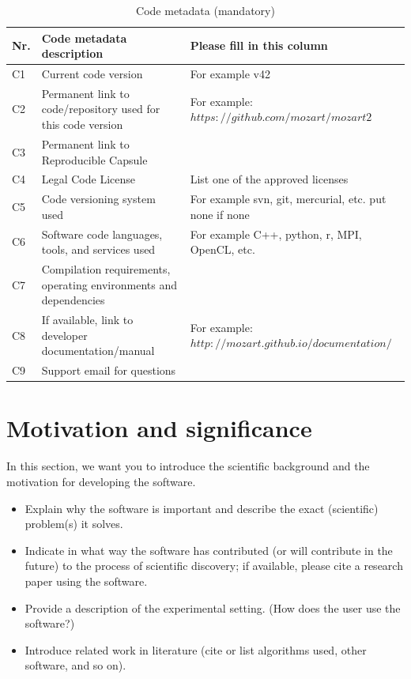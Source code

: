 \documentclass[preprint,12pt, a4paper]{elsarticle}
\begin{document}
\begin{table}[!h]
\begin{tabular}{|l|p{6.5cm}|p{6.5cm}|}
\hline
\textbf{Nr.} & \textbf{Code metadata description} & \textbf{Please fill in this column} \\
\hline
C1 & Current code version & For example v42 \\
\hline
C2 & Permanent link to code/repository used for this code version & For example: $https://github.com/mozart/mozart2$ \\
\hline
C3  & Permanent link to Reproducible Capsule & \\
\hline
C4 & Legal Code License   & List one of the approved licenses \\
\hline
C5 & Code versioning system used & For example svn, git, mercurial, etc. put none if none \\
\hline
C6 & Software code languages, tools, and services used & For example C++, python, r, MPI, OpenCL, etc. \\
\hline
C7 & Compilation requirements, operating environments and dependencies & \\
\hline
C8 & If available, link to developer documentation/manual & For example: $http://mozart.github.io/documentation/$ \\
\hline
C9 & Support email for questions & \\
\hline
\end{tabular}
\caption{Code metadata (mandatory)}
\label{}
\end{table}

\section{Motivation and significance}

In this section, we want you to introduce the scientific background and the
motivation for developing the software.

\begin{itemize}
  \item Explain why the software is important and describe the exact
      (scientific) problem(s) it solves.

  \item Indicate in what way the software has contributed (or will contribute
      in the future) to the process of scientific discovery; if available,
      please cite a research paper using the software.

  \item Provide a description of the experimental setting. (How does the user
      use the software?)

  \item Introduce related work in literature (cite or list algorithms used,
      other software, and so on).
\end{itemize}
\end{document}
